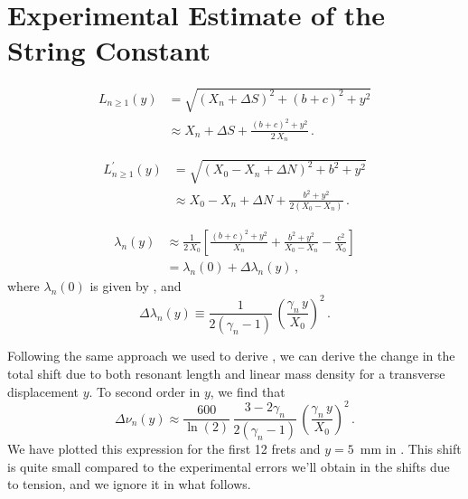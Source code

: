 %
%
%

 \section{Experimental Estimate of the String Constant\label{sct:exp}}

 \begin{equation}
 \begin{split}
L_{n \ge 1}(y) &= \sqrt{\left(X_n + \Delta S\right)^2 + (b + c)^2 + y^2} \\
&\approx X_n + \Delta S + \frac{(b + c)^2 + y^2}{2\, X_n}\, .
 \end{split}
 \end{equation}

 \begin{equation}
 \begin{split}
L^\prime_{n \ge 1}(y) &= \sqrt{\left(X_0 - X_n + \Delta N\right)^2 + b^2 + y^2} \\
&\approx X_0 - X_n + \Delta N + \frac{b^2 + y^2}{2 \left(X_0 - X_n\right)}\, .
 \end{split}
 \end{equation}

 \begin{equation}
 \begin{split}
\lambda_n(y) &\approx \frac{1}{2\, X_0} \left[ \frac{(b + c)^2 + y^2}{X_n} + \frac{b^2 + y^2}{X_0 - X_n} - \frac{c^2}{X_0} \right] \\
&= \lambda_n(0) + \Delta \lambda_n(y) \, ,
 \end{split}
 \end{equation}
where $\lambda_n(0)$ is given by , and
 \begin{equation}
\Delta \lambda_n(y) \equiv \frac{1}{2 \left(\gamma_n - 1\right)}\, \left(\frac{\gamma_n\, y}{X_0}\right)^2\, .
 \end{equation}

Following the same approach we used to derive , we can derive the change in the total shift due to both resonant length and linear mass density for a transverse displacement $y$. To second order in $y$, we find that
 \begin{equation}
\Delta \nu_n(y) \approx \frac{600}{\ln(2)}\, \frac{3 - 2 \gamma_n}{2 \left(\gamma_n - 1\right)}\, \left(\frac{\gamma_n\, y}{X_0}\right)^2\, .
 \end{equation}
We have plotted this expression for the first 12 frets and $y = 5$~mm in . This shift is quite small compared to the experimental errors we'll obtain in the shifts due to tension, and we ignore it in what follows.

